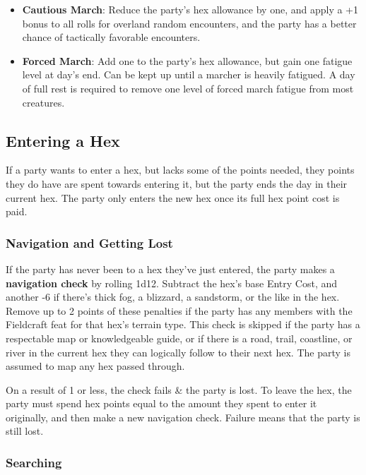 \documentclass{article}
\begin{document}
\begin{multicols}{2}
\begin{itemize}
\tightlist
\item
  \textbf{Cautious March}: Reduce the party's hex allowance by one, and
  apply a +1 bonus to all rolls for overland random encounters, and the
  party has a better chance of tactically favorable encounters.
\item
  \textbf{Forced March}: Add one to the party's hex allowance, but gain
  one fatigue level at day's end. Can be kept up until a marcher is
  heavily fatigued. A day of full rest is required to remove one level
  of forced march fatigue from most creatures.
\end{itemize}

\subsection{Entering a Hex}\label{entering-a-hex}

If a party wants to enter a hex, but lacks some of the points needed,
they points they do have are spent towards entering it, but the party
ends the day in their current hex. The party only enters the new hex
once its full hex point cost is paid.

\subsubsection{Navigation and Getting
Lost}\label{navigation-and-getting-lost}

If the party has never been to a hex they've just entered, the party
makes a \textbf{navigation check} by rolling 1d12. Subtract the hex's
base Entry Cost, and another -6 if there's thick fog, a blizzard, a
sandstorm, or the like in the hex. Remove up to 2 points of these
penalties if the party has any members with the Fieldcraft feat for that
hex's terrain type. This check is skipped if the party has a respectable
map or knowledgeable guide, or if there is a road, trail, coastline, or
river in the current hex they can logically follow to their next hex.
The party is assumed to map any hex passed through.

On a result of 1 or less, the check fails \& the party is lost. To leave
the hex, the party must spend hex points equal to the amount they spent
to enter it originally, and then make a new navigation check. Failure
means that the party is still lost.

\subsubsection{Searching}\label{searching}


\end{multicols}
\end{document}

